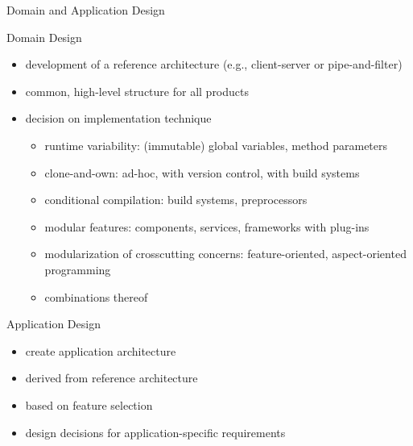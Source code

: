\begin{frame}{Domain and Application Design}
	\begin{mycolumns}[T,columns=3,widths={10,50}]
		\renewcommand{\projectcartoonwidth}{1}
	\mynextcolumn
		\begin{definition}{Domain Design} %
			\begin{itemize}
				\item development of a reference architecture (e.g., client-server or pipe-and-filter)
				\item common, high-level structure for all products
				\item decision on implementation technique
					\begin{itemize}
						\item runtime variability: (immutable) global variables, method parameters
						\item clone-and-own: ad-hoc, with version control, with build systems
						\item conditional compilation: build systems, preprocessors
						\item modular features: components, services, frameworks with plug-ins
						\item modularization of crosscutting concerns: feature-oriented, aspect-oriented programming
						\item combinations thereof
					\end{itemize}
			\end{itemize}
		\end{definition}
	\mynextcolumn
		\begin{definition}{Application Design\\}
			\begin{itemize}
				\item create application architecture
				\item derived from reference architecture
				\item based on feature selection
				\item design decisions for application-specific requirements
			\end{itemize}
		\end{definition}
	\end{mycolumns}
\end{frame}

